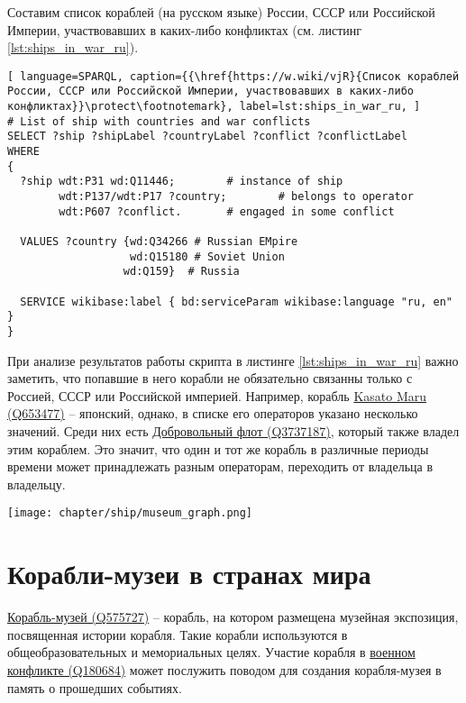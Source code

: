 Составим список кораблей (на русском языке) России, СССР или Российской Империи, участвовавших в каких-либо конфликтах (см. листинг \ref{lst:ships_in_war_ru}).

\begin{lstlisting}[ language=SPARQL, caption={{\href{https://w.wiki/vjR}{Список кораблей России, СССР или Российской Империи, участвовавших в каких-либо конфликтах}}\protect\footnotemark}, label=lst:ships_in_war_ru, ]
# List of ship with countries and war conflicts
SELECT ?ship ?shipLabel ?countryLabel ?conflict ?conflictLabel
WHERE
{
  ?ship wdt:P31 wd:Q11446;        # instance of ship
        wdt:P137/wdt:P17 ?country;        # belongs to operator
        wdt:P607 ?conflict.       # engaged in some conflict
  
  VALUES ?country {wd:Q34266 # Russian EMpire
                   wd:Q15180 # Soviet Union
                  wd:Q159}  # Russia

  SERVICE wikibase:label { bd:serviceParam wikibase:language "ru, en" }
}
\end{lstlisting}

При анализе результатов работы скрипта в листинге \ref{lst:ships_in_war_ru} важно заметить, что попавшие в него корабли не обязательно связанны только с Россией, СССР или Российской империей. Например, корабль \href{https://www.wikidata.org/wiki/Q653477}{Kasato Maru (Q653477)} -- японский, однако, в списке его операторов указано несколько значений. Среди них есть \href{https://www.wikidata.org/wiki/Q3737187}{Добровольный флот (Q3737187)}, который также владел этим кораблем. Это значит, что один и тот же корабль в различные периоды времени может принадлежать разным операторам, переходить от владельца в владельцу.

  
\begin{figure*}[ht]
  \texttt{[image: chapter/ship/museum\_graph.png]}
  \caption[Граф стран и кораблей-музеев]{Фрагмент графа стран, кораблей-музеев и конфликтов, построенный по скрипту в листинге \ref{lst:museum_graph}.}%
  \label{fig:museum_graph}%
\end{figure*}
\section{Корабли-музеи в странах мира}

\href{https://www.wikidata.org/wiki/Q575727}{Корабль-музей (Q575727)} -- корабль, на котором размещена музейная экспозиция, посвященная истории корабля. Такие корабли используются в общеобразовательных и мемориальных целях. Участие корабля в \href{https://www.wikidata.org/wiki/Q180684}{военном конфликте (Q180684)} может послужить поводом для создания корабля-музея в память о прошедших событиях. 


